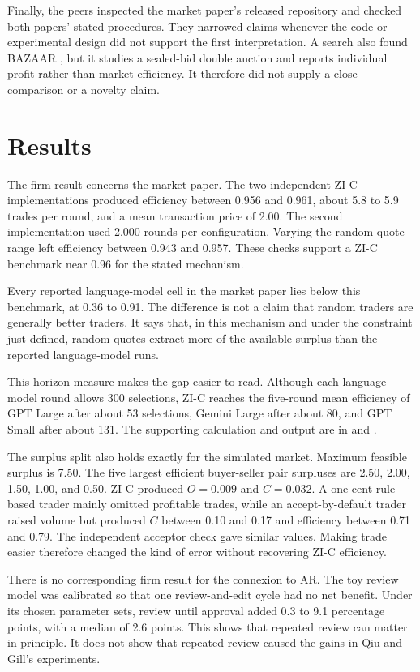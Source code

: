 \documentclass{article}
\begin{document}
Finally, the peers inspected the market paper's released repository \cite{q-repository} and checked both papers' stated procedures. They narrowed claims whenever the code or experimental design did not support the first interpretation. A search also found BAZAAR \cite{bazaar}, but it studies a sealed-bid double auction and reports individual profit rather than market efficiency. It therefore did not supply a close comparison or a novelty claim.

\section{Results}

The firm result concerns the market paper. The two independent ZI-C implementations produced efficiency between 0.956 and 0.961, about 5.8 to 5.9 trades per round, and a mean transaction price of 2.00. The second implementation used 2,000 rounds per configuration. Varying the random quote range left efficiency between 0.943 and 0.957. These checks support a ZI-C benchmark near 0.96 for the stated mechanism.

Every reported language-model cell in the market paper lies below this benchmark, at 0.36 to 0.91. The difference is not a claim that random traders are generally better traders. It says that, in this mechanism and under the constraint just defined, random quotes extract more of the available surplus than the reported language-model runs.

This horizon measure makes the gap easier to read. Although each language-model round allows 300 selections, ZI-C reaches the five-round mean efficiency of GPT Large after about 53 selections, Gemini Large after about 80, and GPT Small after about 131. The supporting calculation and output are in  and .

The surplus split also holds exactly for the simulated market. Maximum feasible surplus is 7.50. The five largest efficient buyer-seller pair surpluses are 2.50, 2.00, 1.50, 1.00, and 0.50. ZI-C produced $O=0.009$ and $C=0.032$. A one-cent rule-based trader mainly omitted profitable trades, while an accept-by-default trader raised volume but produced $C$ between 0.10 and 0.17 and efficiency between 0.71 and 0.79. The independent acceptor check gave similar values. Making trade easier therefore changed the kind of error without recovering ZI-C efficiency.

There is no corresponding firm result for the connexion to AR. The toy review model was calibrated so that one review-and-edit cycle had no net benefit. Under its chosen parameter sets, review until approval added 0.3 to 9.1 percentage points, with a median of 2.6 points. This shows that repeated review can matter in principle. It does not show that repeated review caused the gains in Qiu and Gill's experiments.
\end{document}
